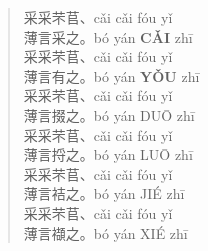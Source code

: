     \begin{quotation}
采采芣苢、cǎi cǎi fóu yǐ\\
薄言采之。bó yán \textbf{CǍI} zhī\\
采采芣苢、cǎi cǎi fóu yǐ\\
薄言有之。bó yán \textbf{YǑU} zhī\\
  
采采芣苢、cǎi cǎi fóu yǐ\\
薄言掇之。bó yán DUŌ zhī\\
采采芣苢、cǎi cǎi fóu yǐ\\
薄言捋之。bó yán LUŌ zhī\\
  
采采芣苢、cǎi cǎi fóu yǐ\\
薄言袺之。bó yán JIÉ zhī\\
采采芣苢、cǎi cǎi fóu yǐ\\
薄言襭之。bó yán XIÉ zhī\\
%  


%  

%  
\end{quotation}






